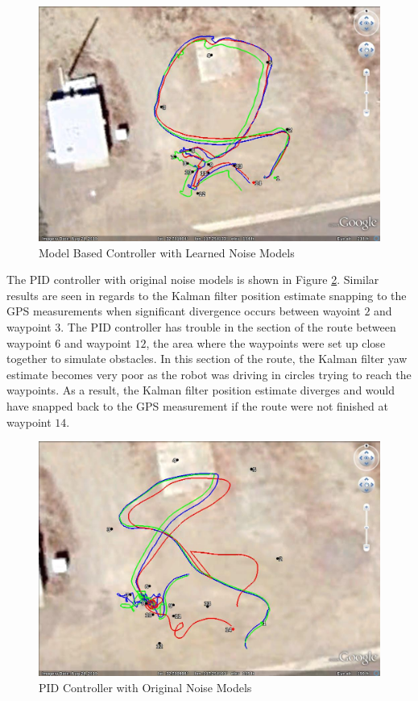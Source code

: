 \begin{figure}[ht!]
	\centering
	\includegraphics[width=.75\textwidth]{images/GE/20101203_1545_kf_lyapNewQR}
	\caption{Model Based Controller with Learned Noise Models}
	\label{fig:kfResults2}
\end{figure}

The PID controller with original noise models is shown in Figure \ref{fig:kfResults3}. Similar results are seen in regards to the Kalman filter position estimate snapping to the GPS measurements when significant divergence occurs between wayoint $2$ and waypoint $3$. The PID controller has trouble in the section of the route between waypoint $6$ and waypoint $12$, the area where the waypoints were set up close together to simulate obstacles. In this section of the route, the Kalman filter yaw estimate becomes very poor as the robot was driving in circles trying to reach the waypoints. As a result, the Kalman filter position estimate diverges and would have snapped back to the GPS measurement if the route were not finished at waypoint $14$.

\begin{figure}[ht!]
	\centering
	\includegraphics[width=.75\textwidth]{images/GE/20101203_1755_kf_pidOrigQR}
	\caption{PID Controller with Original Noise Models}
	\label{fig:kfResults3}
\end{figure}

